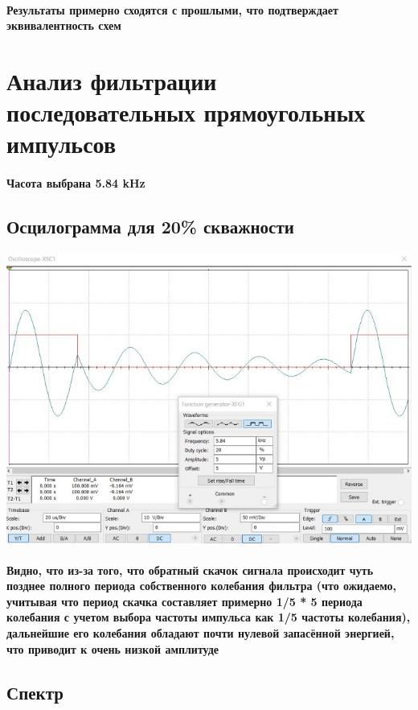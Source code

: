 \documentclass[12pt,a4paper]{article}
\begin{document}
	\paragraph*{Результаты примерно сходятся с прошлыми, что подтверждает эквивалентность схем}
	
	\newpage
	
	\section*{Анализ фильтрации последовательных прямоугольных импульсов}
	
	\paragraph{Часота выбрана 5.84 kHz}
	
	\subsection*{Осцилограмма для 20\% скважности}
	
	\includegraphics[width=0.7\linewidth]{src/oscil_2}
	
	
	\paragraph*{Видно, что из-за того, что обратный скачок сигнала происходит чуть позднее полного периода собственного колебания фильтра (что ожидаемо, учитывая что период скачка составляет примерно 1/5 * 5 периода колебания с учетом выбора частоты импульса как 1/5 частоты колебания), дальнейшие его колебания обладают почти нулевой запасённой энергией, что приводит к очень низкой амплитуде}
	
	\subsection*{Спектр}
	
\end{document}
